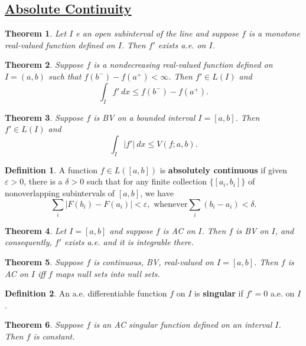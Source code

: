 \documentclass[11pt]{amsart}
\newtheorem*{theorem*}{Theorem}
\theoremstyle{definition}
\newtheorem*{definition*}{Definition}
\renewcommand\leq{\leqslant}
\renewcommand\:{\colon}
\newcommand{\dx}{\ dx}
\begin{document}
\subsection*{\underline{Absolute Continuity}}
\vskip20pt

\begin{theorem*}
	Let $I$ e an open subinterval of the line and suppose $f$ is a monotone real-valued function defined on $I$. Then $f'$ exists a.e. on $I$.
\end{theorem*}

\begin{theorem*}
	Suppose $f$ is a nondecreasing real-valued function defined on $I = (a,b)$ such that $f(b^-) - f(a^+) < \infty$. Then $f' \in L(I)$ and
		\[ \int_I f' \dx \leq f(b^-) - f(a^+). \]
\end{theorem*}

\begin{theorem*}
	Suppose $f$ is BV on a bounded interval $I = [a,b]$. Then $f' \in L(I)$ and
		\[ \int_I |f'| \dx \leq V(f; a,b). \]
\end{theorem*}

\begin{definition*}
	A function $f \in L([a,b])$ is \textbf{absolutely continuous} if given $\varepsilon > 0$, there is a $\delta > 0$ such that for any finite collection $\{[a_i, b_i]\}$ of nonoverlapping subintervals of $[a,b]$, we have 
		\[ \sum_i |F(b_i) - F(a_i)| < \varepsilon, \text{ whenever} \sum_i (b_i - a_i) < \delta. \]
\end{definition*}

\begin{theorem*}
	Let $I = [a,b]$ and suppose $f$ is AC on $I$. Then $f$ is BV on $I$, and consequently, $f'$ exists a.e. and it is integrable there.
\end{theorem*}

\begin{theorem*}
	Suppose $f$ is continuous, BV, real-valued on $I = [a,b]$. Then $f$ is AC on $I$ iff $f$ maps null sets into null sets.
\end{theorem*}

\begin{definition*}
	An a.e. differentiable function $f$ on $I$ is \textbf{singular} if $f' = 0$ a.e. on $I$.
\end{definition*}

\begin{theorem*}
	Suppose $f$ is an AC singular function defined on an interval $I$. Then $f$ is constant.
\end{theorem*}
\end{document}
